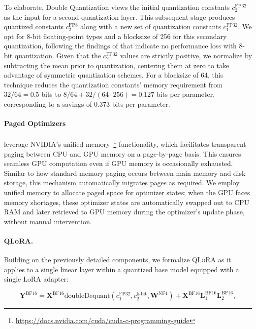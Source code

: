 To elaborate, Double Quantization views the initial quantization constants $c_2^{\text{FP32}}$ as the input for a second quantization layer. This subsequent stage produces quantized constants $c_2^{\text{FP8}}$ along with a new set of quantization constants $c_1^{\text{FP32}}$. We opt for 8-bit floating-point types and a blocksize of 256 for this secondary quantization, following the findings of \citet{dettmers2022case} that indicate no performance loss with 8-bit quantization. 
Given that the $c_2^{\text{FP32}}$ values are strictly positive, we normalize by subtracting the mean prior to quantization, centering them at zero to take advantage of symmetric quantization schemes. For a blocksize of 64, this technique reduces the quantization constants’ memory requirement from $32/64=0.5$ bits to $8/64 + 32/(64\cdot256) = 0.127$ bits per parameter, corresponding to a savings of 0.373 bits per parameter.

\paragraph{Paged Optimizers} leverage NVIDIA's unified memory~\footnote{\tiny \url{https://docs.nvidia.com/cuda/cuda-c-programming-guide}} functionality, which facilitates transparent paging between CPU and GPU memory on a page-by-page basis. This ensures seamless GPU computation even if GPU memory is occasionally exhausted. Similar to how standard memory paging occurs between main memory and disk storage, this mechanism automatically migrates pages as required. We employ unified memory to allocate paged space for optimizer states; when the GPU faces memory shortages, these optimizer states are automatically swapped out to CPU RAM and later retrieved to GPU memory during the optimizer’s update phase, without manual intervention.

\paragraph{\textsc{QLoRA}.} Building on the previously detailed components, we formalize \textsc{QLoRA} as it applies to a single linear layer within a quantized base model equipped with a single LoRA adapter:

\begin{equation}
    \mathbf{Y}^{\text{BF16}} =  \mathbf{X}^{\text{BF16}} \text{doubleDequant}(c_1^{\text{FP32}}, c_2^{\text{k-bit}}, \mathbf{W}^{\text{NF4}}) + \mathbf{X}^{\text{BF16}}\mathbf{L}^{\text{BF16}}_1\mathbf{L}^{\text{BF16}}_2,
\end{equation}


